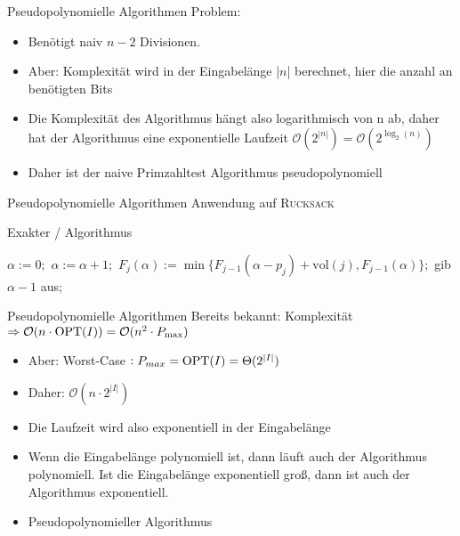 \begin{frame}{Pseudopolynomielle Algorithmen}
Problem:

\begin{itemize}
\item
Benötigt naiv $n-2$ Divisionen.
\item
Aber: Komplexität wird in der Eingabelänge |$n$| berechnet, hier die anzahl an benötigten Bits
\item
Die Komplexität des Algorithmus hängt also logarithmisch von n ab, daher hat der Algorithmus eine exponentielle Laufzeit $\mathcal{O}(2^{|n|}) = \mathcal{O}(2^{\log_2{(n)}})$
\item Daher ist der naive Primzahltest Algorithmus pseudopolynomiell

\end{itemize}
\end{frame}

\begin{frame}{Pseudopolynomielle Algorithmen}
Anwendung auf \textsc{Rucksack}
\newline

\begin{algorithm}[H]
    \caption{Exakter \rucksack/ Algorithmus}
        \begin{algorithmic}
            \State $\alpha:=0;$
            \Repeat
            \State $\alpha:=\alpha+1;$
            \State $F_j(\alpha):=\min\{F_{j-1}(\alpha-p_j)+\text{vol}(j),F_{j-1}(\alpha)\};$
            \EndFor
            \State gib $\alpha-1$ aus$;$
        \end{algorithmic}
\end{algorithm}

\end{frame}

\begin{frame}{Pseudopolynomielle Algorithmen}
Bereits bekannt: Komplexität $\Rightarrow \mathcal{O}( n \cdot \operatorname{OPT}(I)) = \mathcal{O}( n^2 \cdot P_{\max})$ 
\begin{itemize}
	\item
	Aber: Worst-Case $: P_{max} = \operatorname{OPT}(I) = \Theta(2^{|I|})$
	\item
	Daher: 
	$\mathcal{O}(n\cdot 2^{|I|})$
	\item
	Die Laufzeit wird also exponentiell in der Eingabelänge
	\item
	Wenn die Eingabelänge polynomiell ist, dann läuft auch der Algorithmus polynomiell. Ist die Eingabelänge exponentiell groß, dann ist auch der Algorithmus exponentiell.
	\item
	\Rightarrow Pseudopolynomieller Algorithmus


\end{itemize}

\end{frame}


